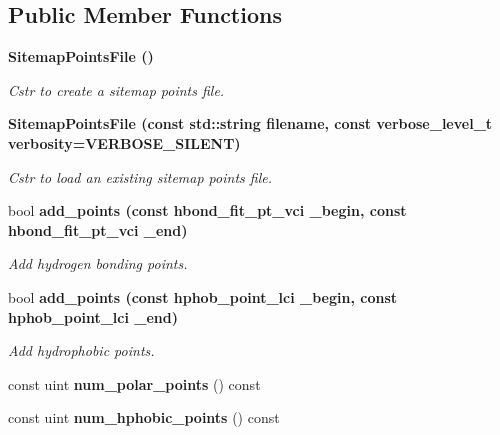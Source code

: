 \subsection*{Public Member Functions}
\begin{CompactItemize}
\item 
\bf{Sitemap\-Points\-File} ()\label{classSimSite3D_1_1SitemapPointsFile_db5b966cb4e3f26a969479259b7a63b5}

\begin{CompactList}\small\item\em Cstr to create a sitemap points file. \item\end{CompactList}\item 
\bf{Sitemap\-Points\-File} (const std::string filename, const verbose\_\-level\_\-t verbosity=VERBOSE\_\-SILENT)\label{classSimSite3D_1_1SitemapPointsFile_5f355b3286eaea41596b433e8d5cd476}

\begin{CompactList}\small\item\em Cstr to load an existing sitemap points file. \item\end{CompactList}\item 
bool \bf{add\_\-points} (const hbond\_\-fit\_\-pt\_\-vci \_\-begin, const hbond\_\-fit\_\-pt\_\-vci \_\-end)\label{classSimSite3D_1_1SitemapPointsFile_0f7b8e2ccb3f1dc27fcc4720b0ae14c5}

\begin{CompactList}\small\item\em Add hydrogen bonding points. \item\end{CompactList}\item 
bool \bf{add\_\-points} (const hphob\_\-point\_\-lci \_\-begin, const hphob\_\-point\_\-lci \_\-end)\label{classSimSite3D_1_1SitemapPointsFile_5dd5cd935f9623f2e8e3ce4051c156ba}

\begin{CompactList}\small\item\em Add hydrophobic points. \item\end{CompactList}\item 
const uint \textbf{num\_\-polar\_\-points} () const \label{classSimSite3D_1_1SitemapPointsFile_4a9728a68610afe41d65332ff73bcbf2}

\item 
const uint \textbf{num\_\-hphobic\_\-points} () const \label{classSimSite3D_1_1SitemapPointsFile_5d261bb85ca34bf9797ab126d8c46960}

\end{CompactItemize}
